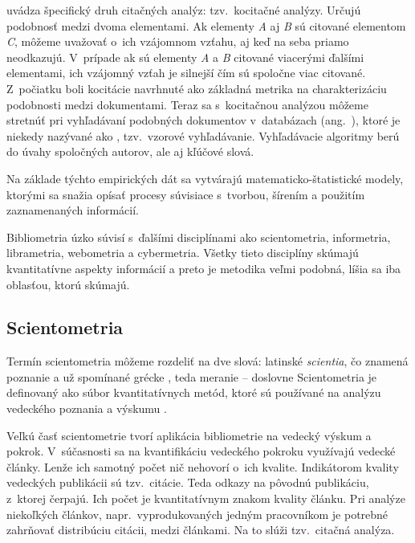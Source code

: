 \citet{Vavrikova2008} uvádza špecifický druh citačných analýz: tzv.~kocitačné
analýzy.  Určujú podobnosť medzi dvoma elementami.  Ak
elementy \emph{A} aj \emph{B} sú citované elementom \emph{C}, môžeme uvažovať
o~ich vzájomnom vzťahu, aj keď na seba priamo neodkazujú.  V~prípade ak sú
elementy \emph{A} a \emph{B} citované viacerými ďalšími elementami, ich vzájomný
vzťah je silnejší čím sú spoločne viac citované.  Z~počiatku boli kocitácie
navrhnuté ako základná metrika na charakterizáciu podobnosti medzi dokumentami.
Teraz sa s~kocitačnou analýzou môžeme stretnúť pri vyhľadávaní podobných
dokumentov v~databázach (ang.~), ktoré je niekedy
nazývané ako , tzv.~vzorové vyhľadávanie.  Vyhľadávacie
algoritmy berú do úvahy spoločných autorov, ale aj kľúčové slová.

Na základe týchto empirických dát sa vytvárajú matematicko-štatistické modely,
ktorými sa snažia opísať procesy súvisiace s~tvorbou, šírením a použitím
zaznamenaných informácií.

Bibliometria úzko súvisí s~ďalšími disciplínami ako scientometria, informetria,
librametria, webometria a cybermetria.  Všetky tieto disciplíny skúmajú
kvantitatívne aspekty informácií a preto je metodika veľmi podobná, líšia sa iba
oblasťou, ktorú skúmajú.


\subsection{Scientometria}

Termín scientometria môžeme rozdeliť na dve slová: latinské
\emph{scientia}, čo znamená poznanie a už
spomínané grécke , teda
meranie -- doslovne  Scientometria je definovaný ako
súbor kvantitatívnych metód, ktoré sú používané na analýzu vedeckého poznania a
výskumu \citep{Hood2001}.

Veľkú časť scientometrie tvorí aplikácia bibliometrie na vedecký výskum a
pokrok.  V~súčasnosti sa na kvantifikáciu vedeckého pokroku využívajú vedecké
články.  Lenže ich samotný počet nič nehovorí o~ich kvalite.  Indikátorom
kvality vedeckých publikácii sú tzv.~citácie.  Teda odkazy na pôvodnú
publikáciu, z~ktorej čerpajú.  Ich počet je kvantitatívnym znakom kvality
článku.  Pri analýze niekoľkých článkov, napr.~vyprodukovaných jedným
pracovníkom je potrebné zahrňovať distribúciu citácii, medzi článkami.  Na to
slúži tzv.~citačná analýza.

